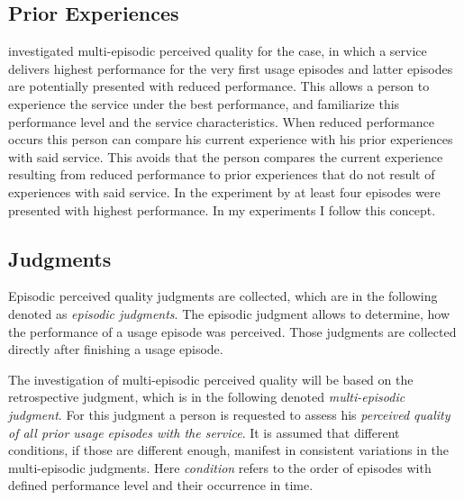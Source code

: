 \subsection{Prior Experiences}
\citet{moller_single-call_2011} investigated multi-episodic perceived quality for the case, in which a service delivers highest performance for the very first usage episodes and latter episodes are potentially presented with reduced performance.
This allows a person to experience the service under the best performance, and familiarize this performance level and the service characteristics.
When reduced performance occurs this person can compare his current experience with his prior experiences with said service.
This avoids that the person compares the current experience resulting from reduced performance to prior experiences that do not result of experiences with said service.
In the experiment by \citet{moller_single-call_2011} at least four episodes were presented with highest performance.
In my experiments I follow this concept.

\subsection{Judgments}
Episodic perceived quality judgments are collected, which are in the following denoted as \emph{episodic judgments}.
The episodic judgment allows to determine, how the performance of a usage episode was perceived.
Those judgments are collected directly after finishing a usage episode.

The investigation of multi-episodic perceived quality will be based on the retrospective judgment, which is in the following denoted \emph{multi-episodic judgment}.
For this judgment a person is requested to assess his \emph{perceived quality of all prior usage episodes with the service}.
It is assumed that different conditions, if those are different enough, manifest in consistent variations in the multi-episodic judgments.
Here \emph{condition} refers to the order of episodes with defined performance level and their occurrence in time.

